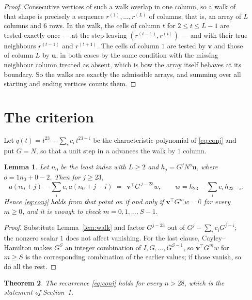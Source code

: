 \documentclass[11pt,a4paper]{article}
\theoremstyle{plain}
\newtheorem{theorem}{Theorem}
\newtheorem{lemma}[theorem]{Lemma}
\theoremstyle{definition}
\begin{document}
\begin{proof}
Consecutive vertices of such a walk overlap in one column, so a walk of that shape is
precisely a sequence $r^{(1)},\dots,r^{(L)}$ of columns, that is, an array of $L$ columns
and $6$ rows. In the walk, the cells of column $t$ for $2\le t\le L-1$ are tested
exactly once --- at the step leaving $(r^{(t-1)},r^{(t)})$ --- and with their true
neighbours $r^{(t-1)}$ and $r^{(t+1)}$. The cells of column $1$ are tested by
$\mathbf{v}$ and those of column $L$ by $\mathbf{u}$, in both cases by the same condition
with the missing neighbour column treated as absent, which is how the array itself behaves at
its boundary. So the walks are exactly the admissible arrays, and summing over all starting
and ending vertices counts them.
\end{proof}

\section{The criterion}

Let $q(t)=t^{23}-\sum_i c_i\,t^{23-i}$ be the characteristic polynomial of
\eqref{eq:conj} and put $G=N$, so that a unit step in $n$ advances the walk by
$1$ column.

\begin{lemma}\label{lem:crit}
Let $n_0$ be the least index with $L\ge2$ and $h_j=G^{j}N^{o}\mathbf{u}$, where
$o=1n_0+0-2$. Then for $j\ge23$,
\[
a(n_0+j)-\sum_i c_i\,a(n_0+j-i)\;=\;\,\mathbf{v}^{\!\top}G^{\,j-23}w,
\qquad w=h_{23}-\sum_i c_i\,h_{23-i} .
\]
Hence \eqref{eq:conj} holds from that point on if and only if
$\mathbf{v}^{\!\top}G^{m}w=0$ for every $m\ge0$, and it is enough to check
$m=0,1,\dots,S-1$.
\end{lemma}

\begin{proof}
Substitute Lemma~\ref{lem:walk} and factor $G^{j-23}$ out of
$G^{j}-\sum_ic_iG^{j-i}$; the nonzero scalar $1$ does not affect
vanishing. For the last clause, Cayley--Hamilton makes $G^{S}$ an integer combination of
$I,G,\dots,G^{S-1}$, so $\mathbf{v}^{\!\top}G^{m}w$ for $m\ge S$ is the corresponding
combination of the earlier values; if those vanish, so do all the rest.
\end{proof}

\begin{theorem}
The recurrence \eqref{eq:conj} holds for every $n>28$, which is the statement of
Section~1.
\end{theorem}
\end{document}
